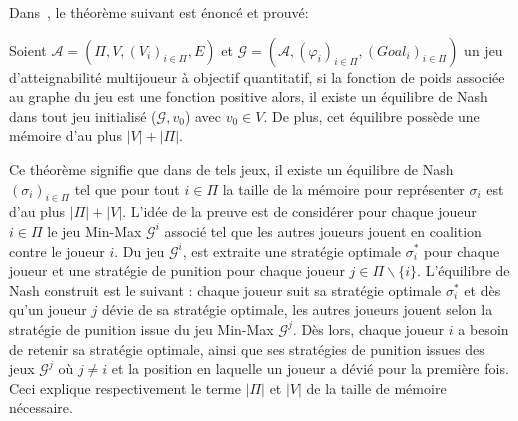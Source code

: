 



 Dans~\cite{DBLP:conf/lfcs/BrihayePS13}, le théorème suivant est énoncé et prouvé:

\begin{thm}
	Soient $\mathcal{A} = (\Pi, V, (V_{i})_{i \in \Pi}, E)$ et $\mathcal{G} = (\mathcal{A},(\varphi _{i})_{i \in \Pi}, (Goal_{i})_{i \in \Pi})$ un jeu d'atteignabilité multijoueur à objectif quantitatif, si la fonction de poids associée au graphe du jeu est une fonction positive alors, il existe un équilibre de Nash dans tout jeu initialisé ($\mathcal{G},v_{0}$) avec $v_{0}\in V$. De plus, cet équilibre possède une mémoire d'au plus $|V| + |\Pi|$.
\end{thm}

Ce théorème signifie que dans de tels jeux, il existe un équilibre de Nash $(\sigma_i)_{i\in \Pi}$ tel que pour tout $i \in \Pi$ la taille de la mémoire pour représenter $\sigma_i$ est d'au plus $|\Pi| + |V|$. L'idée de la preuve est de considérer  pour chaque joueur $i \in \Pi$ le jeu Min-Max $\mathcal{G}^i$ associé tel que les autres joueurs jouent en coalition contre le joueur $i$. Du jeu $\mathcal{G}^i$, est extraite une stratégie optimale $\sigma_i^*$ pour chaque joueur et une stratégie de punition pour chaque joueur $j \in \Pi \backslash \{i\}$. L'équilibre de Nash construit est le suivant : chaque joueur suit sa stratégie optimale $\sigma_i^*$ et dès qu'un joueur $j$ dévie de sa stratégie optimale, les autres joueurs jouent selon la stratégie de punition issue du jeu Min-Max $\mathcal{G}^j$. Dès lors, chaque joueur $i$ a besoin de retenir sa stratégie optimale, ainsi que ses stratégies de punition issues des jeux $\mathcal{G}^j$ où $j \neq i$ et la position en laquelle un joueur a dévié pour la première fois. Ceci explique respectivement le terme $|\Pi|$ et $|V|$ de la taille de mémoire nécessaire.
